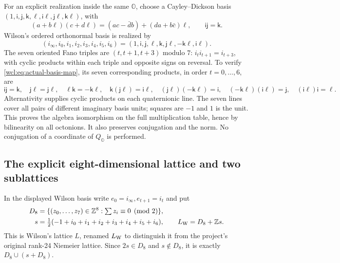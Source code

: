For an explicit realization inside the same $\mathbb O$, choose a
Cayley--Dickson basis
$(1,\mathsf i,\mathsf j,\mathsf k,\ell,\mathsf i\ell,
\mathsf j\ell,\mathsf k\ell)$, with
\[
 (a+b\ell)(c+d\ell)=(ac-\bar d b)+(da+b\bar c)\ell,\qquad
 \mathsf i\mathsf j=\mathsf k .
\]
Wilson's ordered orthonormal basis is realized by
\begin{equation}
 (i_\infty,i_0,i_1,i_2,i_3,i_4,i_5,i_6)
 =(1,\mathsf i,\mathsf j,\ell,\mathsf k,
                  \mathsf j\ell,-\mathsf k\ell,\mathsf i\ell).
 \label{wcl:eq:actual-basis-map}
\end{equation}
The seven oriented Fano triples are $(t,t+1,t+3)$ modulo $7$:
$i_ti_{t+1}=i_{t+3}$, with cyclic products within each triple and
opposite signs on reversal. To verify \eqref{wcl:eq:actual-basis-map},
its seven corresponding products, in order $t=0,\ldots,6$, are
\[
 \mathsf i\mathsf j=\mathsf k,\quad
 \mathsf j\ell=\mathsf j\ell,\quad
 \ell\mathsf k=-\mathsf k\ell,\quad
 \mathsf k(\mathsf j\ell)=\mathsf i\ell,\quad
 (\mathsf j\ell)(-\mathsf k\ell)=\mathsf i,\quad
 (-\mathsf k\ell)(\mathsf i\ell)=\mathsf j,\quad
 (\mathsf i\ell)\mathsf i=\ell.
\]
Alternativity supplies cyclic products on each quaternionic line.
The seven lines cover all pairs of different imaginary basis units;
squares are $-1$ and $1$ is the unit. This proves the algebra
isomorphism on the full multiplication table, hence by bilinearity on
all octonions. It also preserves conjugation and the norm. No
conjugation of a coordinate of $Q_{\mathbb O}$ is performed.

\subsection{The explicit eight-dimensional lattice and two sublattices}

In the displayed Wilson basis write $e_0=i_\infty,e_{t+1}=i_t$ and put
\[
\begin{aligned}
 D_8&=\{(z_0,\ldots,z_7)\in\mathbb Z^8:\textstyle\sum z_i\equiv0\pmod2\},\\
 s&=\tfrac12(-1+i_0+i_1+i_2+i_3+i_4+i_5+i_6),\qquad
 L_{\rm W}=D_8+\mathbb Zs.
\end{aligned}
\]
This is Wilson's lattice $L$, renamed $L_{\rm W}$ to distinguish it
from the project's original rank-24 Niemeier lattice. Since $2s\in
D_8$ and $s\notin D_8$, it is exactly $D_8\cup(s+D_8)$.

